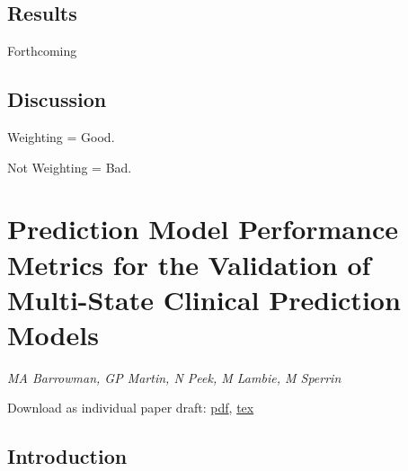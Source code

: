 \documentclass[12pt,PhD,twoside,openright]{muthesis}
\begin{document}
\hypertarget{results-1}{%
\section{Results}\label{results-1}}

Forthcoming

\hypertarget{discussion}{%
\section{Discussion}\label{discussion}}

Weighting = Good.

Not Weighting = Bad.

\hypertarget{chap-performance-metrics}{%
\chapter{Prediction Model Performance Metrics for the Validation of Multi-State Clinical Prediction Models}\label{chap-performance-metrics}}

\emph{MA Barrowman, GP Martin, N Peek, M Lambie, M Sperrin}

Download as individual paper draft: \href{Chapters/ind_05-Performance_Metrics.pdf}{pdf}, \href{Chapters/ind_05-Performance_Metrics.tex}{tex}

\hypertarget{introduction-4}{%
\section{Introduction}\label{introduction-4}}
\end{document}
